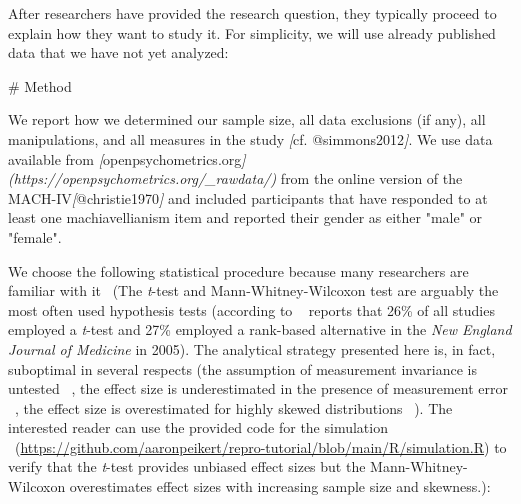 \documentclass[psych,tutorial,accept,moreauthors,pdftex]{Definitions/mdpi}
\newenvironment{Shaded}{\begin{snugshade}}{\end{snugshade}}
\newcommand{\CommentTok}[1]{\textcolor[rgb]{0.56,0.35,0.01}{\textit{#1}}}
\newcommand{\FunctionTok}[1]{\textcolor[rgb]{0.00,0.00,0.00}{#1}}
\newcommand{\NormalTok}[1]{#1}
\newcommand{\OtherTok}[1]{\textcolor[rgb]{0.56,0.35,0.01}{#1}}
\begin{document}
\begin{paracol}{2}
\switchcolumn


After researchers have provided the research question, they typically
proceed to explain how they want to study it. For simplicity, we will
use already published data that we have not yet analyzed:

\vspace{+6pt}
\end{paracol}
\nointerlineskip
\begin{adjustwidth}{0.5cm}{0cm} 
\begin{Shaded}
\begin{Highlighting}[]
\FunctionTok{\# Method}

\NormalTok{We report how we determined our sample size, all data exclusions (if any), all}
\NormalTok{manipulations, and all measures in the study }\CommentTok{[}\OtherTok{cf. @simmons2012}\CommentTok{]}\NormalTok{. We use data}
\NormalTok{available from }\CommentTok{[}\OtherTok{openpsychometrics.org}\CommentTok{](https://openpsychometrics.org/\_rawdata/)}
\NormalTok{from the online version of the MACH{-}IV}\CommentTok{[}\OtherTok{@christie1970}\CommentTok{]}\NormalTok{ and included participants}
\NormalTok{that have responded to at least one machiavellianism item and reported their}
\NormalTok{gender as either "male" or "female".}
\end{Highlighting}
\end{Shaded}
\end{adjustwidth}
\begin{paracol}{2}
\switchcolumn


We choose the following statistical procedure because many researchers
are familiar {with it}
~(The \emph{t}-test and Mann-Whitney-Wilcoxon test
  are arguably the most often used hypothesis tests (according to
 ~\citep{fagerlandTtestsNonparametricTests2012, hortonStatisticalMethodsJournal2005}
  reports that 26\% of all studies employed a \emph{t}-test and 27\% employed a
  rank-based alternative in the \emph{New England Journal of Medicine}
  in 2005). The analytical strategy presented here is, in fact,
  suboptimal in several respects (the assumption of measurement
  invariance is untested
 ~\citep{putnickMeasurementInvarianceConventions2016}, the effect size
  is underestimated in the presence of measurement error
 ~\citep{frostCorrectingRegressionDilution2000}, the effect size is
  overestimated for highly skewed distributions
 ~\citep{stonehouseRobustnessTestsCombined1998}). The interested reader
  can use the {provided code for the simulation}
~\mbox{(\url{https://github.com/aaronpeikert/repro-tutorial/blob/main/R/simulation.R})} to verify that the \emph{t}-test provides unbiased
  effect sizes but the Mann-Whitney-Wilcoxon overestimates effect sizes
  with increasing sample size and skewness.):

\vspace{+6pt}
\end{paracol}
\end{document}
